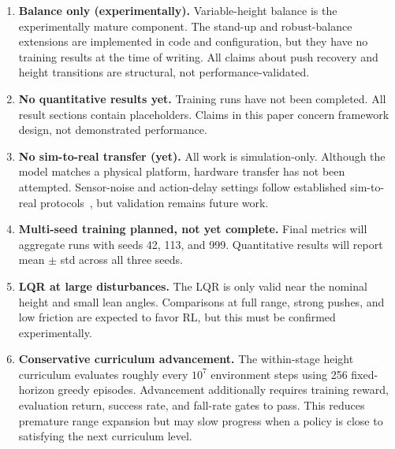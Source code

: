 \documentclass[conference]{IEEEtran}
\begin{document}
\begin{enumerate}
    \item \textbf{Balance only (experimentally).}
    Variable-height balance is the experimentally mature component.
    The stand-up and robust-balance extensions are implemented in code
    and configuration, but they have no training results at the time of writing.
    All claims about push recovery and height transitions are structural,
    not performance-validated.

    \item \textbf{No quantitative results yet.}
    Training runs have not been completed.
    All result sections contain placeholders.
    Claims in this paper concern framework design, not demonstrated
    performance.

    \item \textbf{No sim-to-real transfer (yet).}
    All work is simulation-only.
    Although the model matches a physical platform, hardware transfer
    has not been attempted.
    Sensor-noise and action-delay settings follow established
    sim-to-real protocols~\cite{tobin2017domain,peng2018simtoreal,tan2018simtoreal},
    but validation remains future work.

    \item \textbf{Multi-seed training planned, not yet complete.}
    Final metrics will aggregate runs with seeds 42, 113, and 999.
    Quantitative results will report mean $\pm$ std across all three seeds.

    \item \textbf{LQR at large disturbances.}
    The LQR is only valid near the nominal height and small lean angles.
    Comparisons at full range, strong pushes, and low friction are
    expected to favor RL, but this must be confirmed experimentally.

    \item \textbf{Conservative curriculum advancement.}
    The within-stage height curriculum evaluates roughly every
    $10^7$ environment steps using 256 fixed-horizon greedy episodes.
    Advancement additionally requires training reward, evaluation return,
    success rate, and fall-rate gates to pass.
    This reduces premature range expansion but may slow progress when a
    policy is close to satisfying the next curriculum level.
\end{enumerate}
\end{document}
